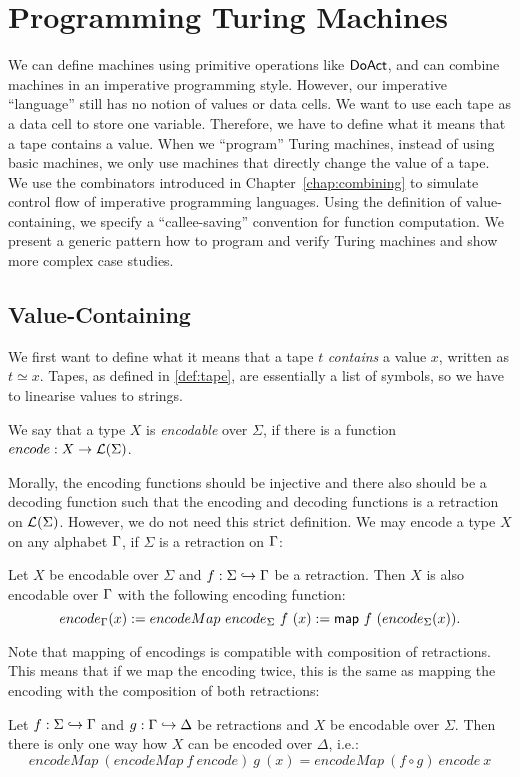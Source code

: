 \chapter{Programming Turing Machines}
\label{chap:programming}

We can define machines using primitive operations like $\textsf{DoAct}$, and can combine machines in an imperative programming style.  However, our
imperative ``language'' still has no notion of values or data cells.  We want to use each tape as a data cell to store one variable.  Therefore, we
have to define what it means that a tape contains a value.  When we ``program'' Turing machines, instead of using basic machines, we only use machines
that directly change the value of a tape.  We use the combinators introduced in Chapter~\ref{chap:combining} to simulate control flow of imperative
programming languages.  Using the definition of value-containing, we specify a ``callee-saving'' convention for function computation.  We present a
generic pattern how to program and verify Turing machines and show more complex case studies.


\section{Value-Containing}
\label{sec:value-containing}

We first want to define what it means that a tape $t$ \emph{contains} a value $x$, written as $t \simeq x$.  Tapes, as defined in \ref{def:tape}, are
essentially a list of symbols, so we have to linearise values to strings.

\begin{definition}
  We say that a type $X$ is \emph{encodable} over $\Sigma$, if there is a function $encode : X \rightarrow \mathcal{L}(\Sigma)$.
\end{definition}

Morally, the encoding functions should be injective and there also should be a decoding function such that the encoding and decoding functions is a
retraction on $\mathcal{L}(\Sigma)$.  However, we do not need this strict definition.  We may encode a type $X$ on any alphabet $\Gamma$, if $\Sigma$ is a
retraction on $\Gamma$:
\begin{definition}
  \label{def:Encode_map}
  Let $X$ be encodable over $\Sigma$ and $f : \Sigma \hookrightarrow \Gamma$ be a retraction.  Then $X$ is also encodable over $\Gamma$ with the following
  encoding function:
  \[ encode_\Gamma(x) := encodeMap~encode_\Sigma~f~(x) := \textsf{map}~f~(encode_\Sigma(x)). \]
\end{definition}
Note that mapping of encodings is compatible with composition of retractions.  This means that if we map the encoding twice, this is the same as
mapping the encoding with the composition of both retractions:
\begin{lemma}
  \label{lem:Encode_map_comp}
  Let $f : \Sigma \hookrightarrow \Gamma$ and $g : \Gamma \hookrightarrow \Delta$ be retractions and $X$ be encodable over $\Sigma$.  Then there is only
  one way how $X$ can be encoded over $\Delta$, i.e.:
  \[ encodeMap~(encodeMap~f~encode)~g~(x) = encodeMap~(f \circ g)~encode~x \]
\end{lemma}

